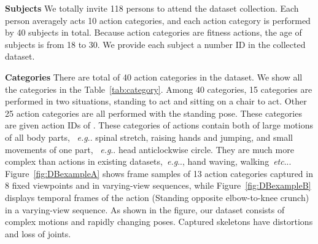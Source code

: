 \documentclass[journal]{IEEEtran}
\makeatletter
\DeclareRobustCommand\onedot{\futurelet\@let@token\@onedot}
\def\@onedot{\ifx\@let@token.\else.\null\fi\xspace}
\def\eg{\emph{e.g}\onedot} \def\Eg{\emph{E.g}\onedot}
\def\etc{\emph{etc}\onedot} \def\vs{\emph{vs}\onedot}
\makeatother
\begin{document}
\textbf{Subjects} We totally invite 118 persons to attend the dataset collection. Each person averagely acts 10 action categories, and each action category is performed by 40 subjects in total. Because action categories are fitness actions, the age of subjects is from 18 to 30. We provide each subject a number ID in the collected dataset.

\textbf{Categories} There are total of 40 action categories in the dataset. We show all the categories in the Table~\ref{tab:category}.
Among 40 categories, 15 categories are performed in two situations, standing to act and sitting on a chair to act. Other 25 action categories are all performed with the standing pose. These categories are given action IDs of . These categories of actions contain both of large motions of all body parts, ~\eg spinal stretch, raising hands and jumping, and small movements of one part, ~\eg head anticlockwise circle. They are much more complex than actions in existing datasets,~\eg, hand waving, walking~\etc. Figure~\ref{fig:DBexampleA} shows frame samples of 13 action categories captured in 8 fixed viewpoints and in varying-view sequences, while Figure~\ref{fig:DBexampleB} displays temporal frames of the action  (Standing opposite elbow-to-knee crunch) in a varying-view sequence. As shown in the figure, our dataset consists of complex motions and rapidly changing poses. Captured skeletons have distortions and loss of joints.
\end{document}

